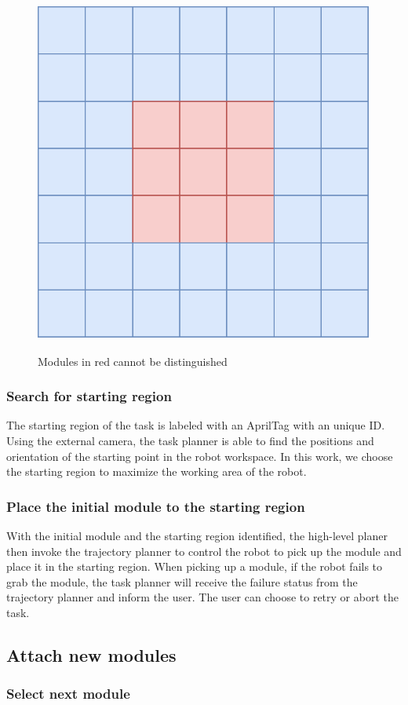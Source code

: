 \begin{figure}[ht!]%
\centering
{\includegraphics[width=0.3\columnwidth]{pics/moduleloop2.pdf}}
\caption{Modules in red cannot be distinguished}
\label{fig:loop2}
\end{figure}

\subsubsection{Search for starting region}
The starting region of the task is labeled with an AprilTag with an unique ID. Using the external camera, the task planner is able to find the positions and orientation of the starting point in the robot workspace. In this work, we choose the starting region to maximize the working area of the robot.

\subsubsection{Place the initial module to the starting region}
With the initial module and the starting region identified, the high-level planer then invoke the trajectory planner to control the robot to pick up the module and place it in the starting region.
When picking up a module, if the robot fails to grab the module, the task planner will receive the failure status from the trajectory planner and inform the user. The user can choose to retry or abort the task.

\subsection{Attach new modules}
\subsubsection{Select next module}\label{sec:nextmodule}


